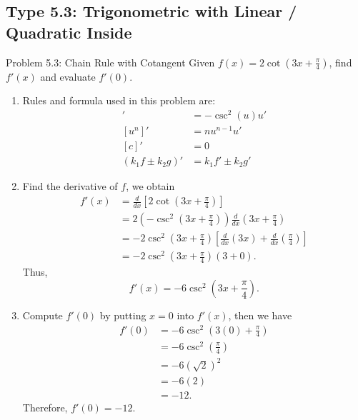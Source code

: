 \documentclass[11pt,a4paper]{article}
\begin{document}
\subsection{Type 5.3: Trigonometric with Linear / Quadratic Inside}
\begin{problembox}{Problem 5.3: Chain Rule with Cotangent}
Given $f(x) = 2\cot\left(3x + \frac{\pi}{4}\right)$, find $f'(x)$ and evaluate $f'(0)$.
\end{problembox}
\begin{solutionbox}
\begin{enumerate}
	\item [Step 1.] Rules and formula used in this problem are:
	\begin{align*}
		[\cot(u)]' &= -\csc^2(u) u' \\
		[u^n]' &= n u^{n-1} u' \\
		[c]' &= 0 \\
		(k_1f \pm k_2 g)' &= k_1f' \pm k_2g'
	\end{align*}
	
	\item [Step 2.] Find the derivative of $f$, we obtain
	\begin{align*}
		f'(x) &= \frac{d}{dx} \left[ 2\cot\left(3x + \frac{\pi}{4}\right) \right] \\
		&= 2 \left( -\csc^2\left(3x + \frac{\pi}{4}\right) \right) \frac{d}{dx} \left(3x + \frac{\pi}{4}\right) \\
		&= -2\csc^2\left(3x + \frac{\pi}{4}\right) \left[ \frac{d}{dx}(3x) + \frac{d}{dx}\left(\frac{\pi}{4}\right) \right] \\
		&= -2\csc^2\left(3x + \frac{\pi}{4}\right) (3 + 0).
	\end{align*}
	Thus,
	\begin{equation*}
		f'(x) = -6\csc^2\left(3x + \frac{\pi}{4}\right).
	\end{equation*}
	
	\item [Step 3.] Compute $f'(0)$ by putting $x = 0$ into $f'(x)$, then we have
	\begin{align*}
		f'(0) &= -6\csc^2\left(3(0) + \frac{\pi}{4}\right) \\
		&= -6\csc^2\left(\frac{\pi}{4}\right) \\
		&= -6(\sqrt{2})^2 \\
		&= -6(2) \\
		&= -12.
	\end{align*}
	Therefore, $f'(0) = -12$.
\end{enumerate}
\end{solutionbox}
\end{document}
